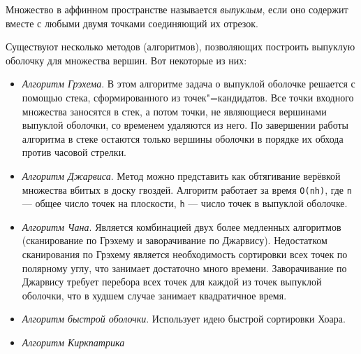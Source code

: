 \documentclass[a4paper,12pt,notitlepage,headsepline,pdftex]{scrartcl}
\begin{document}
  Множество в аффинном пространстве называется \emph{выпуклым}, если оно
  содержит вместе с любыми двумя точками соединяющий их отрезок.

  Существуют несколько методов (алгоритмов), позволяющих построить выпуклую
  оболочку для множества вершин.
  Вот некоторые из них:
  \begin{itemize}
    \item \emph{Алгоритм Грэхема}.
      В этом алгоритме задача о выпуклой оболочке решается с помощью стека,
      сформированного из точек"=кандидатов.
      Все точки входного множества заносятся в стек, а потом точки, не
      являющиеся вершинами выпуклой оболочки, со временем удаляются из него.
      По завершении работы алгоритма в стеке остаются только вершины оболочки
      в порядке их обхода против часовой стрелки.\cite{book3}
    \item \emph{Алгоритм Джарвиса}.
      Метод можно представить как обтягивание верёвкой множества вбитых в
      доску гвоздей.
      Алгоритм работает за время \verb'O(nh)', где \verb'n' --- общее число
      точек на плоскости, \verb'h' --- число точек в выпуклой
      оболочке.\cite{book4}
    \item \emph{Алгоритм Чана}.
      Является комбинацией двух более медленных алгоритмов (сканирование по
      Грэхему  и заворачивание по Джарвису).
      Недостатком сканирования по Грэхему является необходимость сортировки
      всех точек по полярному углу, что занимает достаточно много времени.
      Заворачивание по Джарвису требует перебора всех точек для каждой из
      точек выпуклой оболочки, что в худшем случае занимает квадратичное
      время.\cite{book5}
    \item \emph{Алгоритм быстрой оболочки}.
      Использует идею быстрой сортировки Хоара.
    \item \emph{Алгоритм Киркпатрика}
  \end{itemize}



\end{document}
